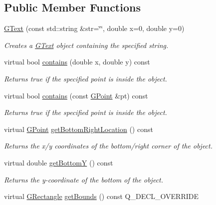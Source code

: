 \subsection*{Public Member Functions}
\begin{DoxyCompactItemize}
\item 
\mbox{\hyperlink{classGText_ad86d52c255aab367ddc6c54baff70846}{G\+Text}} (const std\+::string \&str=\char`\"{}\char`\"{}, double x=0, double y=0)
\begin{DoxyCompactList}\small\item\em Creates a {\ttfamily \mbox{\hyperlink{classGText}{G\+Text}}} object containing the specified string. \end{DoxyCompactList}\item 
virtual bool \mbox{\hyperlink{classGObject_abb6a5d7c03e6eaaae97264c4799ce7c3}{contains}} (double x, double y) const
\begin{DoxyCompactList}\small\item\em Returns {\ttfamily true} if the specified point is inside the object. \end{DoxyCompactList}\item 
virtual bool \mbox{\hyperlink{classGObject_a1dbc9dafaae51958112dbe1267a1f547}{contains}} (const \mbox{\hyperlink{classGPoint}{G\+Point}} \&pt) const
\begin{DoxyCompactList}\small\item\em Returns {\ttfamily true} if the specified point is inside the object. \end{DoxyCompactList}\item 
virtual \mbox{\hyperlink{classGPoint}{G\+Point}} \mbox{\hyperlink{classGObject_a0d41183bf6b08de66fe3907551aab0d7}{get\+Bottom\+Right\+Location}} () const
\begin{DoxyCompactList}\small\item\em Returns the x/y coordinates of the bottom/right corner of the object. \end{DoxyCompactList}\item 
virtual double \mbox{\hyperlink{classGObject_a4316a2406c18e1c6d061fe51fd355490}{get\+BottomY}} () const
\begin{DoxyCompactList}\small\item\em Returns the {\itshape y}-\/coordinate of the bottom of the object. \end{DoxyCompactList}\item 
virtual \mbox{\hyperlink{classGRectangle}{G\+Rectangle}} \mbox{\hyperlink{classGText_a2f46ec8a3b533c690b3b3e56d4f34afe}{get\+Bounds}} () const Q\+\_\+\+D\+E\+C\+L\+\_\+\+O\+V\+E\+R\+R\+I\+DE

\end{DoxyCompactItemize}
